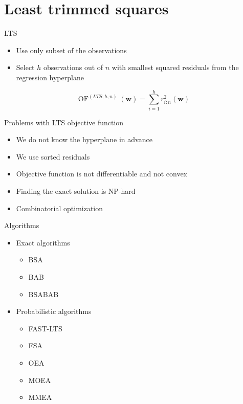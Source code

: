 \documentclass{beamer}
\DeclareMathOperator{\of}{OF}
\let\vec\boldsymbol
\begin{document}
\section{Least trimmed squares}
\setcounter{subsection}{1}

\begin{frame}{LTS}
\begin{itemize}
  \item Use only subset of the observations
  \item Select $h$ observations out of $n$ with smallest squared residuals from the regression hyperplane
\end{itemize}

\begin{equation*}  
        \of^{(LTS,h, n)}(\vec{w}) =  \sum\limits_{i=1}^h r_{i:n}^2(\vec{w})  
\end{equation*}
\end{frame}

\begin{frame}{Problems with LTS objective function}

\begin{itemize}
  \item We do not know the hyperplane in advance
  \item We use sorted residuals
  \item Objective function is not differentiable and not convex
  \item Finding the exact solution is NP-hard
  \item {\color{red} Combinatorial optimization}
\end{itemize}    
\end{frame}

\begin{frame}{Algorithms}

\begin{itemize}
    \item Exact algorithms
    \begin{itemize}
       \item BSA
       \item BAB
       \item BSABAB
    \end{itemize}    
\end{itemize}    

\begin{itemize}
  \item Probabilistic algorithms
  \begin{itemize}
    \item FAST-LTS
    \item FSA
    \item OEA
    \item MOEA
    \item MMEA
  \end{itemize}      
\end{itemize}    


\end{frame}
\end{document}
